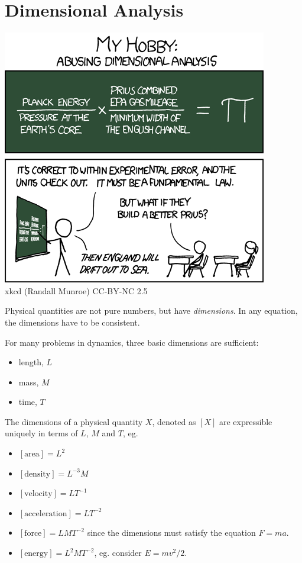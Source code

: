 \documentclass[a4paper]{article}
\begin{document}
\section{Dimensional Analysis}
\begin{center}
  \includegraphics[scale=.75]{images/xkcd_dimensional_analysis.png}\\
  xkcd (Randall Munroe) CC-BY-NC 2.5
\end{center}
Physical quantities are not pure numbers, but have \emph{dimensions}. In any equation, the dimensions have to be consistent.

For many problems in dynamics, three basic dimensions are sufficient:
\begin{itemize}
  \item length, $L$
  \item mass, $M$
  \item time, $T$
\end{itemize}

The dimensions of a physical quantity $X$, denoted as $[X]$ are expressible uniquely in terms of $L$, $M$ and $T$, eg.
\begin{itemize}
  \item $[\text{area}] = L^2$
  \item $[\text{density}] = L^{-3} M$
  \item $[\text{velocity}] = LT^{-1}$
  \item $[\text{acceleration}] = LT^{-2}$
  \item $[\text{force}] = LMT^{-2}$ since the dimensions must satisfy the equation $F = ma$.
  \item $[\text{energy}] = L^2MT^{-2}$, eg. consider $E = mv^2/2$.
\end{itemize}
\end{document}
